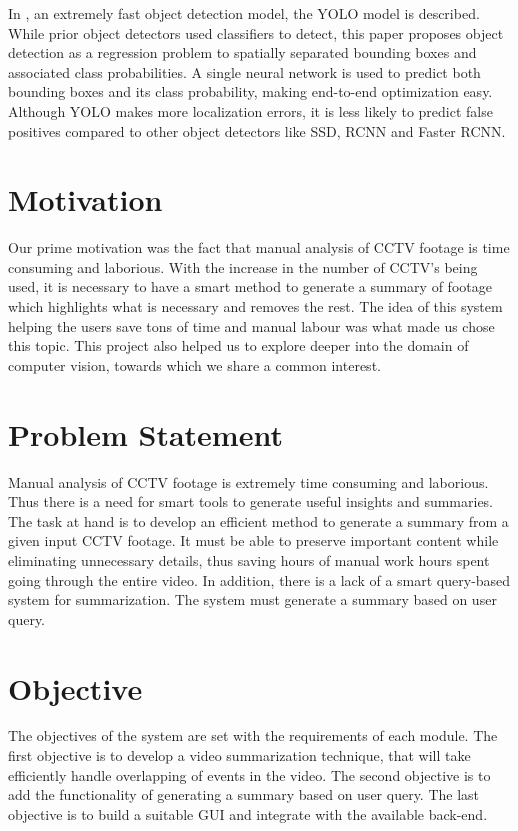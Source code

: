 In \cite{redmon2016you}, an extremely fast object detection model, the YOLO model is described. While prior object detectors used classifiers to detect, this paper proposes object detection as a regression problem to spatially separated bounding boxes and associated class probabilities. A single neural network is used to predict both bounding boxes and its class probability, making end-to-end optimization easy. Although YOLO makes more localization errors, it is less likely to predict false positives compared to other object detectors like SSD, RCNN and Faster RCNN.

\section{Motivation}

Our prime motivation was the fact that manual analysis of CCTV footage is time consuming and laborious. With the increase in the number of CCTV’s being used, it is necessary to have a smart method to generate a summary of footage which highlights what is necessary and removes the rest. The idea of this system helping the users save tons of time and manual labour was what made us chose this topic. This project also helped us to explore deeper into the domain of computer vision, towards which we share a common interest.

\section{Problem Statement}

Manual analysis of CCTV footage is extremely time consuming and laborious. Thus there is a need for smart tools to generate useful insights and summaries.
The task at hand is to develop an efficient method to generate a summary from a given input CCTV footage. It must be able to preserve important content while eliminating unnecessary details, thus saving hours of manual work hours spent going through the entire video. In addition, there is a lack of a smart query-based system for summarization. The system must generate a summary based on user query.


\section{Objective}

The objectives of the system are set with the requirements of each module. The first objective is to develop a video summarization technique, that will take efficiently handle overlapping of events in the video. The second objective is to add the functionality of generating a summary based on user query. The last objective is to build a suitable GUI and integrate with the available back-end.

